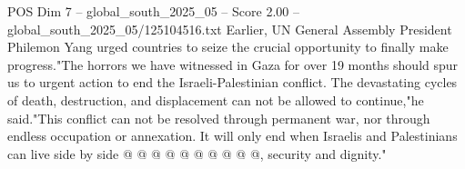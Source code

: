 \begin{textsample}{POS Dim 7 – global\_south\_2025\_05 – Score 2.00 – global\_south\_2025\_05/125104516.txt}
Earlier, UN General Assembly President Philemon Yang urged countries to seize the crucial opportunity to finally make progress."The horrors we have witnessed in Gaza for over 19 months should spur us to urgent action to end the Israeli-Palestinian conflict.
The devastating cycles of death, destruction, and displacement can not be allowed to continue,"he said."This conflict can not be resolved through permanent war, nor through endless occupation or annexation.
It will only end when Israelis and Palestinians can live side by side @ @ @ @ @ @ @ @ @ @, security and dignity."

\end{textsample}
